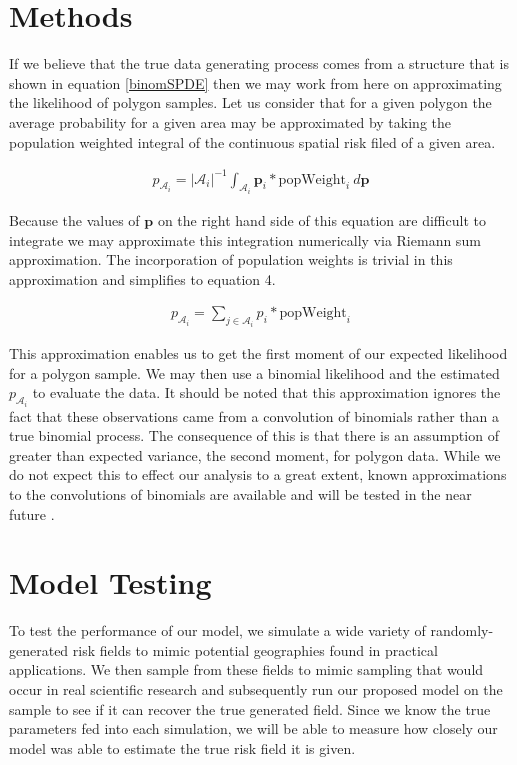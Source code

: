 \documentclass{article}
\begin{document}
\section{Methods}\label{methods}

If we believe that the true data generating process comes from a structure that is shown in equation \ref{binomSPDE} then we may work from here on approximating the likelihood of polygon samples. Let us consider that for a given polygon the average probability for a given area may be approximated by taking the population weighted integral of the continuous spatial risk filed of a given area. 

\begin{align}\label{pIntegral}
p_{\mathcal{A}_i} = |\mathcal{A}_i|^{-1}\int_{\mathcal{A}_i} \boldsymbol{p}_i * \text{popWeight}_i ~ d\boldsymbol{p}
\end{align}

Because the values of $\boldsymbol{p}$ on the right hand side of this equation are difficult to integrate we may approximate this integration numerically via Riemann sum approximation. The incorporation of population weights is trivial in this approximation and simplifies to equation 4.

\begin{align}\label{pRiemann}
p_{\mathcal{A}_i} = \sum_{j \in \mathcal{A}_i} p_i * \text{popWeight}_i
\end{align}

This approximation enables us to get the first moment of our expected likelihood for a polygon sample. We may then use a binomial likelihood and the estimated $p_{\mathcal{A}_i}$ to evaluate the data. It should be noted that this approximation ignores the fact that these observations came from a convolution of binomials rather than a true binomial process. The consequence of this is that there is an assumption of greater than expected variance, the second moment, for polygon data. While we do not expect this to effect our analysis to a great extent, known approximations to the convolutions of binomials are available and will be tested in the near future \cite{Liu2017}.

\section{Model Testing}\label{model testing}

To test the performance of our model, we simulate a wide variety of randomly-generated risk fields to mimic potential geographies found in practical applications. We then sample from these fields to mimic sampling that would occur in real scientific research and subsequently run our proposed model on the sample to see if it can recover the true generated field. Since we know the true parameters fed into each simulation, we will be able to measure how closely our model was able to estimate the true risk field it is given.
\end{document}

